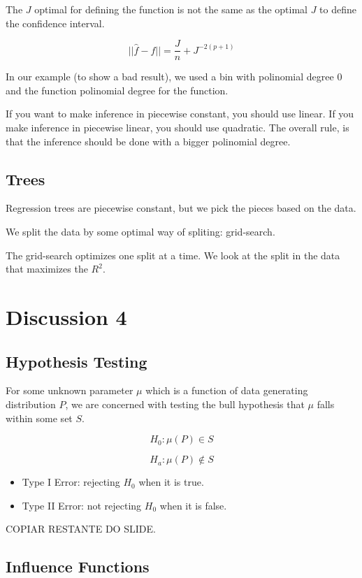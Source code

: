 \documentclass{article}
\begin{document}
The $J$ optimal for defining the function is not the same as the optimal $J$ to define the confidence interval.

$$
|| \hat{f} - f || = \frac{J}{n} + J^{-2(p+1)}
$$

In our example (to show a bad result), we used a bin with polinomial degree 0 and the function polinomial degree for the function.

If you want to make inference in piecewise constant, you should use linear. If you make inference in piecewise linear, you should use quadratic. The overall rule, is that the inference should be done with a bigger polinomial degree.

\subsection{Trees}
Regression trees are piecewise constant, but we pick the pieces based on the data.

We split the data by some optimal way of spliting: grid-search.

The grid-search optimizes one split at a time. We look at the split in the data that maximizes the $R^2$.


\section*{Discussion 4}
\subsection{Hypothesis Testing}

For some unknown parameter $\mu$ which is a function of data generating distribution $P$, we are concerned with testing the bull hypothesis that $\mu$ falls within some set $S$.

$$
H_0: \mu(P) \in S
$$

$$
H_a: \mu(P) \notin S
$$

\begin{itemize}
    \item Type I Error: rejecting $H_0$ when it is true.
    \item Type II Error: not rejecting $H_0$ when it is false.
\end{itemize}

COPIAR RESTANTE DO SLIDE.

\subsection*{Influence Functions}
\end{document}
